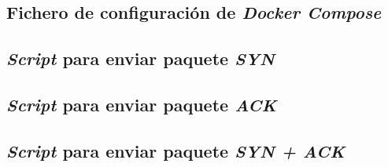 \documentclass{article}
\begin{document}


\subsection*{Fichero de configuración de \textit{Docker Compose}}



\subsection*{\textit{Script} para enviar paquete \textit{SYN}}



\subsection*{\textit{Script} para enviar paquete \textit{ACK}}



\newpage
\subsection*{\textit{Script} para enviar paquete \textit{SYN + ACK}}


\end{document}
